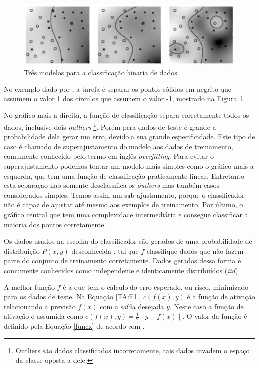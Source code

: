\begin{figure}[htb]
	\centering
	\includegraphics[scale=0.3]{./figuras/2dtoyexample.png}
	\caption{Três modelos para a classificação binaria de dados \cite{Scholkopf2002}}
	\label{fig:2dtoyexample}
\end{figure}

No exemplo dado por \cite{Scholkopf2002}, a tarefa é separar os pontos sólidos em negrito que assumem o valor 1 dos círculos que assumem o valor -1, mostrado na Figura \ref{fig:2dtoyexample}. 

No gráfico mais a direita, a função de classificação separa corretamente todos os dados, inclusive dois \textit{outliers} \footnote{Outliers são dados classificados incorretamente, tais dados invadem o espaço da classe oposta a dele.}. Porém para dados de teste é grande a probabilidade dela gerar um erro, devido a sua grande especificidade. Este tipo de caso é chamado de superajustamento do modelo aos dados de treinamento, comumente conhecido pelo termo em inglês \textit{overfitting}. Para evitar o superajustamento podemos tentar um modelo mais simples como o gráfico mais a esquerda, que tem uma função de classificação praticamente linear. Entretanto esta separação não somente desclassifica os \textit{outliers} mas também casos considerados simples. Temos assim um sub-ajustamento, porque o classificador não é capaz de ajustar até mesmo aos exemplos de treinamento. Por último, o gráfico central que tem uma complexidade intermediária e consegue classificar a maioria dos pontos corretamente.

Os dados usados na escolha do classificador são gerados de uma probabilidade de distribuição $P(x,y)$ desconhecida , tal que $f$ classifique dados que não fazem parte do conjunto de treinamento corretamente. Dados gerados dessa forma é comumente conhecidos como independente e identicamente distribuídos (\textit{iid}). 

A melhor função $f$ é a que tem o cálculo do erro esperado, ou risco, minimizado para os dados de teste. Na Equação \ref{TA:E1}, $c(f(x),y)$ é a função de ativação relacionando a previsão $f(x)$ com a saída desejada $y$. Neste caso a função de ativação é assumida como $c(f(x),y) = \frac{1}{2} \mid y - f(x) \mid$. O valor da função é definido pela Equação \ref{funcx} de acordo com \cite{Burges1998Support, Scholkopf2002}.

